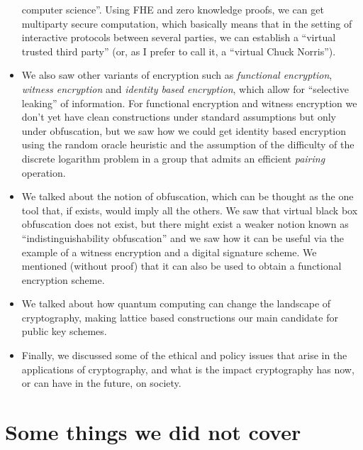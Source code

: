 \begin{itemize}
  computer science''. Using FHE and zero knowledge proofs, we can get
  multiparty secure computation, which basically means that in the
  setting of interactive protocols between several parties, we can
  establish a ``virtual trusted third party'' (or, as I prefer to call
  it, a ``virtual Chuck Norris'').
\item
  We also saw other variants of encryption such as \emph{functional
  encryption}, \emph{witness encryption} and \emph{identity based
  encryption}, which allow for ``selective leaking'' of information. For
  functional encryption and witness encryption we don't yet have clean
  constructions under standard assumptions but only under obfuscation,
  but we saw how we could get identity based encryption using the random
  oracle heuristic and the assumption of the difficulty of the discrete
  logarithm problem in a group that admits an efficient \emph{pairing}
  operation.
\item
  We talked about the notion of obfuscation, which can be thought as the
  one tool that, if exists, would imply all the others. We saw that
  virtual black box obfuscation does not exist, but there might exist a
  weaker notion known as ``indistinguishability obfuscation'' and we saw
  how it can be useful via the example of a witness encryption and a
  digital signature scheme. We mentioned (without proof) that it can
  also be used to obtain a functional encryption scheme.
\item
  We talked about how quantum computing can change the landscape of
  cryptography, making lattice based constructions our main candidate
  for public key schemes.
\item
  Finally, we discussed some of the ethical and policy issues that arise
  in the applications of cryptography, and what is the impact
  cryptography has now, or can have in the future, on society.
\end{itemize}

\section{Some things we did not cover}\label{24-Some-things-we-did-not}

